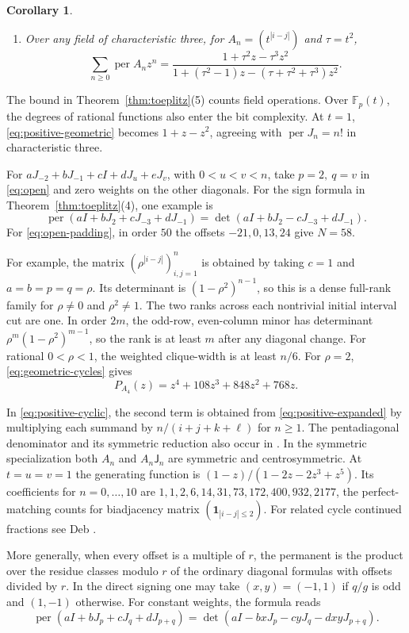 \documentclass[11pt,reqno]{amsart}
\newtheorem{corollary}[theorem]{Corollary}
\theoremstyle{remark}
\numberwithin{equation}{section}
\newcommand{\per}{\operatorname{per}}
\newcommand{\F}{\mathbb F}
\newcommand{\ind}{\mathbf 1}
\begin{document}
\begin{corollary}
\begin{enumerate}
\item Over any field of characteristic three, for
\(A_n=(t^{|i-j|})\) and \(\tau=t^2\),
\begin{equation}\label{eq:positive-geometric}
 \sum_{n\geq0}\per A_n z^n
 =\frac{1+\tau^2z-\tau^3z^2}
        {1+(\tau^2-1)z-(\tau+\tau^2+\tau^3)z^2}.
\end{equation}
\end{enumerate}
\end{corollary}

The bound in Theorem~\ref{thm:toeplitz}(5) counts field
operations. Over \(\F_p(t)\), the degrees of rational functions
also enter the bit complexity. At \(t=1\),
\eqref{eq:positive-geometric} becomes \(1+z-z^2\), agreeing with
\(\per J_n=n!\) in characteristic three.

For \(aJ_{-2}+bJ_{-1}+cI+dJ_u+eJ_v\), with
\(0<u<v<n\), take \(p=2,\ q=v\) in \eqref{eq:open} and zero
weights on the other diagonals. For the sign formula in
Theorem~\ref{thm:toeplitz}(4), one
example is
\[
 \per(aI+bJ_2+cJ_{-3}+dJ_{-1})
   =\det(aI+bJ_2-cJ_{-3}+dJ_{-1}).
\]
For \eqref{eq:open-padding}, in order \(50\) the offsets
\(-21,0,13,24\) give \(N=58\).

For example, the matrix \((\rho^{|i-j|})_{i,j=1}^n\) is obtained by
taking \(c=1\) and \(a=b=p=q=\rho\). Its determinant is
\((1-\rho^2)^{n-1}\), so this is a dense full-rank family for
\(\rho\ne0\) and \(\rho^2\ne1\). The two ranks across each nontrivial
initial interval cut are one. In order \(2m\), the odd-row, even-column
minor has determinant \(\rho^m(1-\rho^2)^{m-1}\), so the rank
is at least \(m\) after any diagonal change. For rational
\(0<\rho<1\), the weighted clique-width is at least \(n/6\).
For \(\rho=2\), \eqref{eq:geometric-cycles} gives
\[
 P_{A_4}(z)=z^4+108z^3+848z^2+768z .
\]

In \eqref{eq:positive-cyclic}, the second term is obtained from
\eqref{eq:positive-expanded} by multiplying each summand by
\(n/(i+j+k+\ell)\) for \(n\ge1\).
The pentadiagonal denominator and its symmetric reduction also
occur in \cite{AK1,AK2}. In the symmetric specialization both
\(A_n\) and \(A_n\mathsf J_n\) are symmetric and centrosymmetric.
At \(t=u=v=1\) the generating function is
\((1-z)/(1-2z-2z^3+z^5)\). Its coefficients for \(n=0,\ldots,10\)
are \(1,1,2,6,14,31,73,172,400,932,2177\), the perfect-matching
counts for biadjacency matrix \((\ind_{|i-j|\le2})\).
For related cycle continued fractions see Deb \cite{Deb}.


More generally, when every offset is a multiple of \(r\),
the permanent is the product over the residue classes modulo
\(r\) of the ordinary diagonal formulas with offsets divided
by \(r\). In the direct signing one may take \((x,y)=(-1,1)\)
if \(q/g\) is odd and \((1,-1)\) otherwise. For constant weights,
the formula reads
\[
 \per(aI+bJ_p+cJ_q+dJ_{p+q})
 =\det(aI-bxJ_p-cyJ_q-dxyJ_{p+q}).
\]
\end{document}
